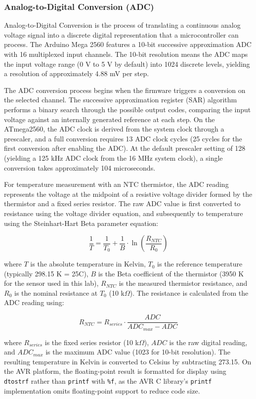 \subsubsection{Analog-to-Digital Conversion (ADC)}

Analog-to-Digital Conversion is the process of translating a continuous analog voltage signal into a discrete digital representation that a microcontroller can process. The Arduino Mega 2560 features a 10-bit successive approximation ADC with 16 multiplexed input channels. The 10-bit resolution means the ADC maps the input voltage range (0 V to 5 V by default) into 1024 discrete levels, yielding a resolution of approximately 4.88 mV per step.

The ADC conversion process begins when the firmware triggers a conversion on the selected channel. The successive approximation register (SAR) algorithm performs a binary search through the possible output codes, comparing the input voltage against an internally generated reference at each step. On the ATmega2560, the ADC clock is derived from the system clock through a prescaler, and a full conversion requires 13 ADC clock cycles (25 cycles for the first conversion after enabling the ADC). At the default prescaler setting of 128 (yielding a 125 kHz ADC clock from the 16 MHz system clock), a single conversion takes approximately 104 microseconds.

For temperature measurement with an NTC thermistor, the ADC reading represents the voltage at the midpoint of a resistive voltage divider formed by the thermistor and a fixed series resistor. The raw ADC value is first converted to resistance using the voltage divider equation, and subsequently to temperature using the Steinhart-Hart Beta parameter equation:

$$\frac{1}{T} = \frac{1}{T_0} + \frac{1}{B} \cdot \ln\left(\frac{R_{NTC}}{R_0}\right)$$

where $T$ is the absolute temperature in Kelvin, $T_0$ is the reference temperature (typically 298.15 K = 25\textdegree C), $B$ is the Beta coefficient of the thermistor (3950 K for the sensor used in this lab), $R_{NTC}$ is the measured thermistor resistance, and $R_0$ is the nominal resistance at $T_0$ (10 k$\Omega$). The resistance is calculated from the ADC reading using:

$$R_{NTC} = R_{series} \cdot \frac{ADC}{ADC_{max} - ADC}$$

where $R_{series}$ is the fixed series resistor (10 k$\Omega$), $ADC$ is the raw digital reading, and $ADC_{max}$ is the maximum ADC value (1023 for 10-bit resolution). The resulting temperature in Kelvin is converted to Celsius by subtracting 273.15. On the AVR platform, the floating-point result is formatted for display using \texttt{dtostrf} rather than \texttt{printf} with \texttt{\%f}, as the AVR C library's \texttt{printf} implementation omits floating-point support to reduce code size.

